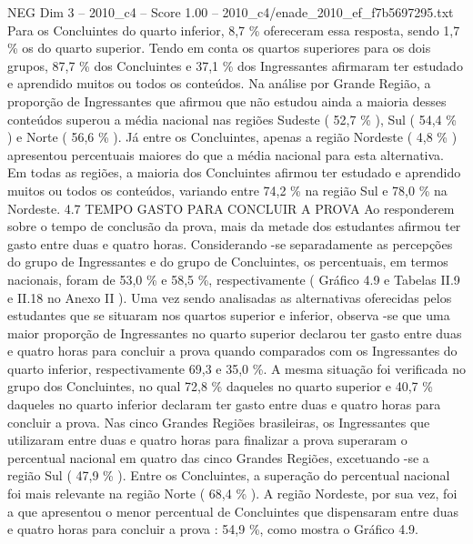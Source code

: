 \begin{textsample}{NEG Dim 3 – 2010\_c4 – Score 1.00 – 2010\_c4/enade\_2010\_ef\_f7b5697295.txt}
Para os Concluintes do quarto inferior, 8,7 \% ofereceram essa resposta, sendo 1,7 \% os do quarto superior.
Tendo em conta os quartos superiores para os dois grupos, 87,7 \% dos Concluintes e 37,1 \% dos Ingressantes afirmaram ter estudado e aprendido muitos ou todos os conteúdos.
Na análise por Grande Região, a proporção de Ingressantes que afirmou que não estudou ainda a maioria desses conteúdos superou a média nacional nas regiões Sudeste ( 52,7 \% ), Sul ( 54,4 \% ) e Norte ( 56,6 \% ).
Já entre os Concluintes, apenas a região Nordeste ( 4,8 \% ) apresentou percentuais maiores do que a média nacional para esta alternativa.
Em todas as regiões, a maioria dos Concluintes afirmou ter estudado e aprendido muitos ou todos os conteúdos, variando entre 74,2 \% na região Sul e 78,0 \% na Nordeste. 4.7 TEMPO GASTO PARA CONCLUIR A PROVA Ao responderem sobre o tempo de conclusão da prova, mais da metade dos estudantes afirmou ter gasto entre duas e quatro horas.
Considerando -se separadamente as percepções do grupo de Ingressantes e do grupo de Concluintes, os percentuais, em termos nacionais, foram de 53,0 \% e 58,5 \%, respectivamente ( Gráfico 4.9 e Tabelas II.9 e II.18 no Anexo II ).
Uma vez sendo analisadas as alternativas oferecidas pelos estudantes que se situaram nos quartos superior e inferior, observa -se que uma maior proporção de Ingressantes no quarto superior declarou ter gasto entre duas e quatro horas para concluir a prova quando comparados com os Ingressantes do quarto inferior, respectivamente 69,3 e 35,0 \%.
A mesma situação foi verificada no grupo dos Concluintes, no qual 72,8 \% daqueles no quarto superior e 40,7 \% daqueles no quarto inferior declaram ter gasto entre duas e quatro horas para concluir a prova.
Nas cinco Grandes Regiões brasileiras, os Ingressantes que utilizaram entre duas e quatro horas para finalizar a prova superaram o percentual nacional em quatro das cinco Grandes Regiões, excetuando -se a região Sul ( 47,9 \% ).
Entre os Concluintes, a superação do percentual nacional foi mais relevante na região Norte ( 68,4 \% ).
A região Nordeste, por sua vez, foi a que apresentou o menor percentual de Concluintes que dispensaram entre duas e quatro horas para concluir a prova : 54,9 \%, como mostra o Gráfico 4.9.

\end{textsample}
